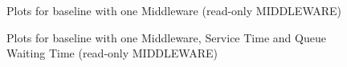 \documentclass[11pt,a4paper]{article}
\begin{document}
\begin{figure}[!h]
  \centering
    \caption{Plots for baseline with one Middleware (read-only MIDDLEWARE)}
  \label{fig:baseline_mw_1_mw_mw_ro}
\end{figure}

\begin{figure}[!h]
  \centering
    \caption{Plots for baseline with one Middleware, Service Time and Queue Waiting Time (read-only MIDDLEWARE)}
  \label{fig:baseline_mw_1_mw_mw_c_ro}
\end{figure}
\end{document}
